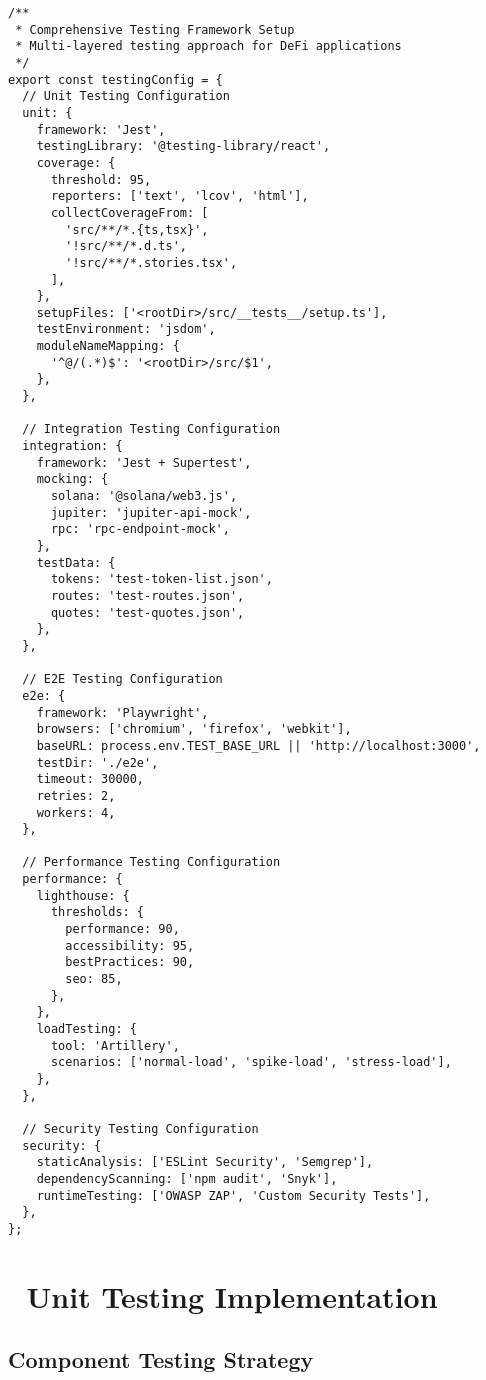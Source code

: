 \documentclass[11pt,a4paper]{article}
\begin{document}
\begin{lstlisting}[style=typescript, caption=Testing Framework Configuration]
/**
 * Comprehensive Testing Framework Setup
 * Multi-layered testing approach for DeFi applications
 */
export const testingConfig = {
  // Unit Testing Configuration
  unit: {
    framework: 'Jest',
    testingLibrary: '@testing-library/react',
    coverage: {
      threshold: 95,
      reporters: ['text', 'lcov', 'html'],
      collectCoverageFrom: [
        'src/**/*.{ts,tsx}',
        '!src/**/*.d.ts',
        '!src/**/*.stories.tsx',
      ],
    },
    setupFiles: ['<rootDir>/src/__tests__/setup.ts'],
    testEnvironment: 'jsdom',
    moduleNameMapping: {
      '^@/(.*)$': '<rootDir>/src/$1',
    },
  },

  // Integration Testing Configuration
  integration: {
    framework: 'Jest + Supertest',
    mocking: {
      solana: '@solana/web3.js',
      jupiter: 'jupiter-api-mock',
      rpc: 'rpc-endpoint-mock',
    },
    testData: {
      tokens: 'test-token-list.json',
      routes: 'test-routes.json',
      quotes: 'test-quotes.json',
    },
  },

  // E2E Testing Configuration
  e2e: {
    framework: 'Playwright',
    browsers: ['chromium', 'firefox', 'webkit'],
    baseURL: process.env.TEST_BASE_URL || 'http://localhost:3000',
    testDir: './e2e',
    timeout: 30000,
    retries: 2,
    workers: 4,
  },

  // Performance Testing Configuration
  performance: {
    lighthouse: {
      thresholds: {
        performance: 90,
        accessibility: 95,
        bestPractices: 90,
        seo: 85,
      },
    },
    loadTesting: {
      tool: 'Artillery',
      scenarios: ['normal-load', 'spike-load', 'stress-load'],
    },
  },

  // Security Testing Configuration
  security: {
    staticAnalysis: ['ESLint Security', 'Semgrep'],
    dependencyScanning: ['npm audit', 'Snyk'],
    runtimeTesting: ['OWASP ZAP', 'Custom Security Tests'],
  },
};
\end{lstlisting}

\section{🔬 Unit Testing Implementation}

\subsection{Component Testing Strategy}
\end{document}
